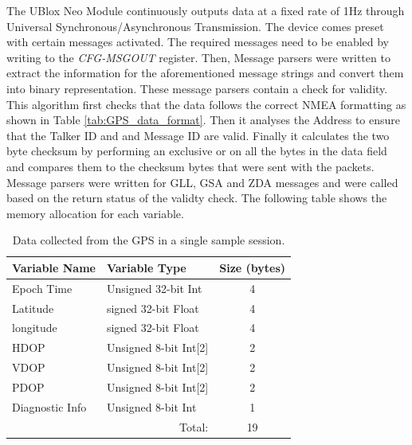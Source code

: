 The UBlox Neo Module continuously outputs data at a fixed rate of 1Hz \cite{UBLOX_M9N_INTERFACE} through Universal Synchronous/Asynchronous Transmission. The device comes preset with certain messages activated. The required messages need to be enabled by writing to the \textit{CFG-MSGOUT} register. Then, Message parsers were written to extract the information for the aforementioned message strings and convert them into binary representation. These message parsers contain a check for validity. This algorithm first checks that the data follows the correct NMEA formatting as shown in Table \ref{tab:GPS_data_format}. Then it analyses the Address to ensure that the Talker ID and and Message ID are valid. Finally it calculates the two byte checksum by performing an exclusive or on all the bytes in the data field and compares them to the checksum bytes that were sent with the packets. Message parsers were written for GLL, GSA and ZDA messages and were called based on the return status of the validty check.
The following table shows the memory allocation for each variable. 
 \begin{table}[H]
     \centering
     \caption{Data collected from the GPS in a single sample session.}
     \begin{tabular}{|l|l|c|}
     \hline
    \textbf{Variable Name}  &  \textbf{Variable Type} & \textbf{Size (bytes)}  \\
    \hline
          Epoch Time & Unsigned 32-bit Int & 4  \\
          Latitude & signed 32-bit Float & 4 \\
          longitude & signed 32-bit Float & 4 \\
          HDOP & Unsigned 8-bit Int[2] & 2\\
          VDOP & Unsigned 8-bit Int[2] & 2\\
          PDOP & Unsigned 8-bit Int[2] & 2\\
          Diagnostic Info & Unsigned 8-bit Int & 1 \\
          \hline
          \cline{3-3}
          \multicolumn{2}{r}{Total: } & \multicolumn{1}{c}{19}\\
          \cline{3-3}
          \cline{3-3}
          
     \end{tabular}
     \label{tab:GPS_Data}
 \end{table}
 
